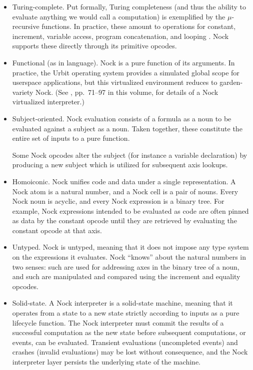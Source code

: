 \documentclass[twoside]{article}
\begin{document}
\begin{itemize}
  \item  \sloppy Turing-complete.  Put formally, Turing completeness (and thus the ability to evaluate anything we would call a computation) is exemplified by the $\mu$-recursive functions.  In practice, these amount to operations for constant, \mbox{increment}, variable access, program concatenation, and looping \citep{Raphael2012}.  Nock supports these directly through its primitive opcodes.

  \item  Functional (as in language).  Nock is a pure function of its arguments.  In practice, the Urbit operating system provides a simulated global scope for userspace applications, but this virtualized environment reduces to garden-variety Nock.  (See , pp.~71–97 in this volume, for details of a Nock virtualized interpreter.)
  \item  Subject-oriented.  Nock evaluation consists of a formula as a noun to be evaluated against a subject as a noun.  Taken together, these constitute the entire set of inputs to a pure function.
  
  Some Nock opcodes alter the subject (for instance a variable declaration) by producing a new subject which is utilized for subsequent axis lookups.

  \item  Homoiconic.  Nock unifies code and data under a single representation.  A Nock atom is a natural number, and a Nock cell is a pair of nouns.  Every Nock noun is acyclic, and every Nock expression is a binary tree.  For example, Nock expressions intended to be evaluated as code are often pinned as data by the constant opcode until they are retrieved by evaluating the constant opcode at that axis.

  \item  Untyped.  Nock is untyped, meaning that it does not impose any type system on the expressions it evaluates.  Nock ``knows'' about the natural numbers in two senses:  such are used for addressing axes in the binary tree of a noun, and such are manipulated and compared using the increment and equality opcodes.

  \item  Solid-state.  A Nock interpreter is a solid-state machine, meaning that it operates from a state to a new state strictly according to inputs as a pure lifecycle function.  The Nock interpreter must commit the results of a successful computation as the new state before subsequent computations, or events, can be evaluated.  Transient evaluations (uncompleted events) and crashes (invalid evaluations) may be lost without consequence, and the Nock interpreter layer persists the underlying state of the machine.
\end{itemize}
\end{document}
